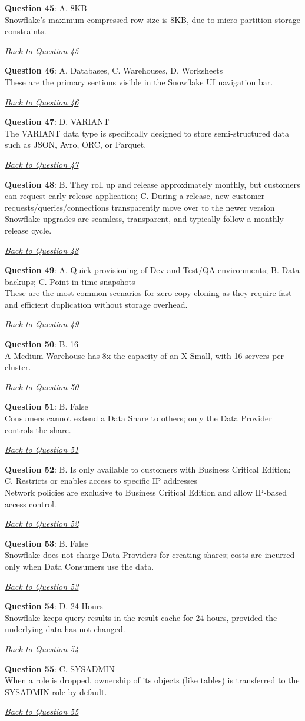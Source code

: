 \documentclass[12pt]{article}
\newcommand{\answer}[2]{%
  \textbf{Question #1}\label{ans:#1}: #2\par
  \smallskip\emph{\hyperref[q:#1]{Back to Question #1}}\par\medskip
}
\begin{document}
\answer{45}{A. 8KB \\
Snowflake’s maximum compressed row size is 8KB, due to micro-partition storage constraints.}

\answer{46}{A. Databases, C. Warehouses, D. Worksheets \\
These are the primary sections visible in the Snowflake UI navigation bar.}

\answer{47}{D. VARIANT \\
The VARIANT data type is specifically designed to store semi-structured data such as JSON, Avro, ORC, or Parquet.}

\answer{48}{B. They roll up and release approximately monthly, but customers can request early release application; C. During a release, new customer requests/queries/connections transparently move over to the newer version \\
Snowflake upgrades are seamless, transparent, and typically follow a monthly release cycle.}

\answer{49}{A. Quick provisioning of Dev and Test/QA environments; B. Data backups; C. Point in time snapshots \\
These are the most common scenarios for zero-copy cloning as they require fast and efficient duplication without storage overhead.}

\answer{50}{B. 16 \\
A Medium Warehouse has 8x the capacity of an X-Small, with 16 servers per cluster.}

\answer{51}{B. False \\
Consumers cannot extend a Data Share to others; only the Data Provider controls the share.}

\answer{52}{B. Is only available to customers with Business Critical Edition; C. Restricts or enables access to specific IP addresses \\
Network policies are exclusive to Business Critical Edition and allow IP-based access control.}

\answer{53}{B. False \\
Snowflake does not charge Data Providers for creating shares; costs are incurred only when Data Consumers use the data.}

\answer{54}{D. 24 Hours \\
Snowflake keeps query results in the result cache for 24 hours, provided the underlying data has not changed.}

\answer{55}{C. SYSADMIN \\
When a role is dropped, ownership of its objects (like tables) is transferred to the SYSADMIN role by default.}
\end{document}
